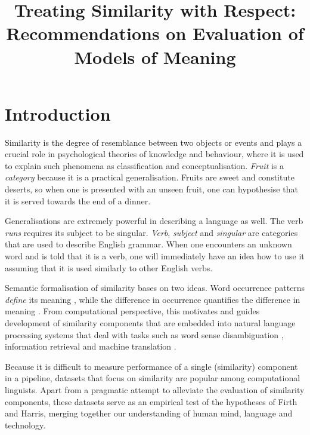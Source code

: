 \documentclass[11pt]{article}
\title{Treating Similarity with Respect: Recommendations on Evaluation of Models of Meaning}
\date{}
\begin{document}
\maketitle

\begin{abstract}

\end{abstract}

\section{Introduction}
\label{sec:introduction}

Similarity is the degree of resemblance between two objects or events \cite{WCS:WCS1282} and plays a crucial role in psychological theories of knowledge and behaviour, where it is used to explain such phenomena as classification and conceptualisation. \textit{Fruit} is a \emph{category} because it is a practical generalisation. Fruits are sweet and constitute deserts, so when one is presented with an unseen fruit, one can hypothesise that it is served towards the end of a dinner.

Generalisations are extremely powerful in describing a language as well. The verb \textit{runs} requires its subject to be singular. \textit{Verb}, \textit{subject} and \textit{singular} are categories that are used to describe English grammar. When one encounters an unknown word and is told that it is a verb, one will immediately have an idea how to use it assuming that it is used similarly to other English verbs.

Semantic formalisation of similarity bases on two ideas. Word occurrence patterns \emph{define} its meaning \cite{firth1957lingtheory}, while the difference in occurrence \textup{quantifies} the difference in meaning \cite{harris1954distributional}. From computational perspective, this motivates and guides development of similarity components that are embedded into natural language processing systems that deal with tasks such as word sense disambiguation \cite{Schutze:1998:AWS:972719.972724}, information retrieval \cite{Salton:1975:VSM:361219.361220} and machine translation \cite{Dagan:1993:CWS:981574.981596}.

Because it is difficult to measure performance of a single (similarity) component in a pipeline, datasets that focus on similarity are popular among computational linguists. Apart from a pragmatic attempt to alleviate the evaluation of similarity components, these datasets serve as an empirical test of the hypotheses of Firth and Harris, merging together our understanding of human mind, language and technology.
\end{document}

